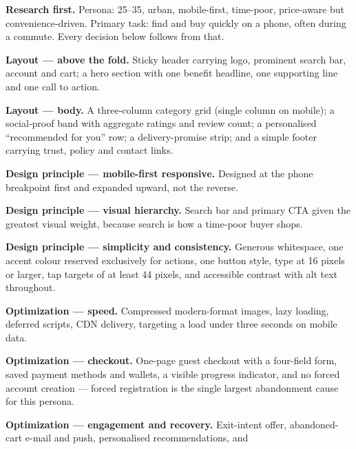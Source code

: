 \begin{qlist}
\textbf{Research first.} Persona: 25--35, urban, mobile-first, time-poor,
price-aware but convenience-driven. Primary task: find and buy quickly on a
phone, often during a commute. Every decision below follows from that.

\begin{apts}
\item \textbf{Layout --- above the fold.} Sticky header carrying logo, prominent
      search bar, account and cart; a hero section with one benefit headline,
      one supporting line and one call to action.
\item \textbf{Layout --- body.} A three-column category grid (single column on
      mobile); a social-proof band with aggregate ratings and review count; a
      personalised ``recommended for you'' row; a delivery-promise strip; and a
      simple footer carrying trust, policy and contact links.
\item \textbf{Design principle --- mobile-first responsive.} Designed at the
      phone breakpoint first and expanded upward, not the reverse.
\item \textbf{Design principle --- visual hierarchy.} Search bar and primary CTA
      given the greatest visual weight, because search is how a time-poor buyer
      shops.
\item \textbf{Design principle --- simplicity and consistency.} Generous
      whitespace, one accent colour reserved exclusively for actions, one
      button style, type at 16 pixels or larger, tap targets of at least 44
      pixels, and accessible contrast with alt text throughout.
\item \textbf{Optimization --- speed.} Compressed modern-format images, lazy
      loading, deferred scripts, CDN delivery, targeting a load under three
      seconds on mobile data.
\item \textbf{Optimization --- checkout.} One-page guest checkout with a
      four-field form, saved payment methods and wallets, a visible progress
      indicator, and no forced account creation --- forced registration is the
      single largest abandonment cause for this persona.
\item \textbf{Optimization --- engagement and recovery.} Exit-intent offer,
      abandoned-cart e-mail and push, personalised recommendations, and

\end{apts}
\end{qlist}
